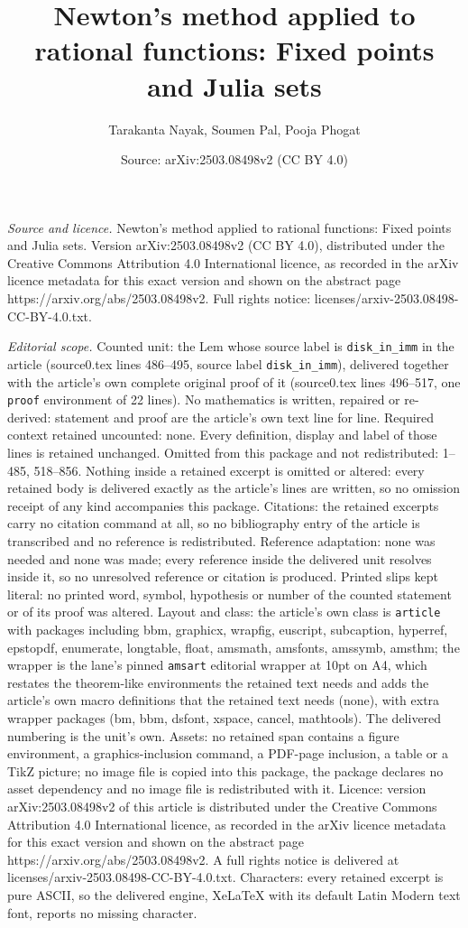 \documentclass[10pt,a4paper]{amsart}
\title[Newton's method applied to rational functions: Fixed points ]{Newton's method applied to rational functions: Fixed points and Julia sets}
\author{Tarakanta Nayak, Soumen Pal, Pooja Phogat}
\date{Source: arXiv:2503.08498v2 (CC BY 4.0)}
\begin{document}
\maketitle

\noindent\emph{Source and licence.} Newton's method applied to rational functions: Fixed points and Julia sets. Version arXiv:2503.08498v2 (CC BY 4.0), distributed under the Creative Commons Attribution 4.0 International licence, as recorded in the arXiv licence metadata for this exact version and shown on the abstract page https://arxiv.org/abs/2503.08498v2. Full rights notice: licenses/arxiv-2503.08498-CC-BY-4.0.txt.\par\smallskip

\noindent\textit{Editorial scope.} Counted unit: the Lem whose source label is \texttt{disk\_in\_imm} in the article (source0.tex lines 486--495, source label \texttt{disk\_in\_imm}), delivered together with the article's own complete original proof of it (source0.tex lines 496--517, one \texttt{proof} environment of 22 lines). No mathematics is written, repaired or re-derived: statement and proof are the article's own text line for line. Required context retained uncounted: none. Every definition, display and label of those lines is retained unchanged. Omitted from this package and not redistributed: 1--485, 518--856. Nothing inside a retained excerpt is omitted or altered: every retained body is delivered exactly as the article's lines are written, so no omission receipt of any kind accompanies this package. Citations: the retained excerpts carry no citation command at all, so no bibliography entry of the article is transcribed and no reference is redistributed. Reference adaptation: none was needed and none was made; every reference inside the delivered unit resolves inside it, so no unresolved reference or citation is produced. Printed slips kept literal: no printed word, symbol, hypothesis or number of the counted statement or of its proof was altered. Layout and class: the article's own class is \texttt{article} with packages including bbm, graphicx, wrapfig, euscript, subcaption, hyperref, epstopdf, enumerate, longtable, float, amsmath, amsfonts, amssymb, amsthm; the wrapper is the lane's pinned \texttt{amsart} editorial wrapper at 10pt on A4, which restates the theorem-like environments the retained text needs and adds the article's own macro definitions that the retained text needs (none), with extra wrapper packages (bm, bbm, dsfont, xspace, cancel, mathtools). The delivered numbering is the unit's own. Assets: no retained span contains a figure environment, a graphics-inclusion command, a PDF-page inclusion, a table or a TikZ picture; no image file is copied into this package, the package declares no asset dependency and no image file is redistributed with it. Licence: version arXiv:2503.08498v2 of this article is distributed under the Creative Commons Attribution 4.0 International licence, as recorded in the arXiv licence metadata for this exact version and shown on the abstract page https://arxiv.org/abs/2503.08498v2. A full rights notice is delivered at licenses/arxiv-2503.08498-CC-BY-4.0.txt. Characters: every retained excerpt is pure ASCII, so the delivered engine, XeLaTeX with its default Latin Modern text font, reports no missing character.
\end{document}
